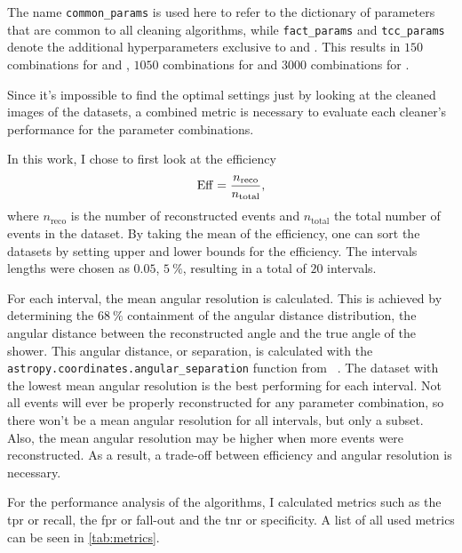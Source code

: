 The name \texttt{common\_params} is used here to refer to the dictionary of parameters that are common
to all cleaning algorithms, while \texttt{fact\_params} and \texttt{tcc\_params} denote the additional
hyperparameters exclusive to \fact{} and \tcc{}.  This results in \(\num{150}\) combinations for
\tailcuts{} and \mars{}, \(\num{1050}\) combinations for \fact{} and \(\num{3000}\) combinations for \tcc{}.

Since it's impossible to find the optimal settings just by looking at the
cleaned images of the datasets, a combined metric is necessary to evaluate each cleaner's performance
for the parameter combinations.

In this work, I chose to first look at the efficiency
\begin{equation}\label{eq:efficiency}
    \operatorname{Eff} =  \frac{n_{\mathrm{reco}}}{n_{\mathrm{total}}},
\end{equation}
where \(n_{\mathrm{reco}}\) is the number of reconstructed events and \(n_{\mathrm{total}}\)
the total number of events in the dataset. By taking the mean of the efficiency, one can sort the
datasets by setting upper and lower bounds for the efficiency. The intervals lengths were chosen as
\(\num{0.05}\), \ie \(\SI{5}{\percent}\), resulting in a total of \(\num{20}\) intervals.

For each interval, the mean angular resolution is calculated. This is achieved by determining the
\(\SI{68}{\percent}\) containment of the angular distance distribution, \ie{} the angular distance
between the reconstructed angle and the true angle of the shower. This angular distance, or separation, is calculated
with the \texttt{astropy.coordinates.angular\_separation} function from \astropy{}~\cite{astropy1, astropy2}. The dataset with the lowest
mean angular resolution is the best performing for each interval. Not all events will ever be properly reconstructed
for any parameter combination, so there won't be a mean angular resolution for all intervals, but only
a subset. Also, the mean angular resolution may be higher when more events were reconstructed.
As a result, a trade-off between efficiency and angular resolution is necessary.

For the performance analysis of the algorithms, I calculated metrics such as the \gls{tpr} or recall,
the \gls{fpr} or fall-out and the \gls{tnr} or specificity. A list of all used metrics can be seen in 
\autoref{tab:metrics}.


